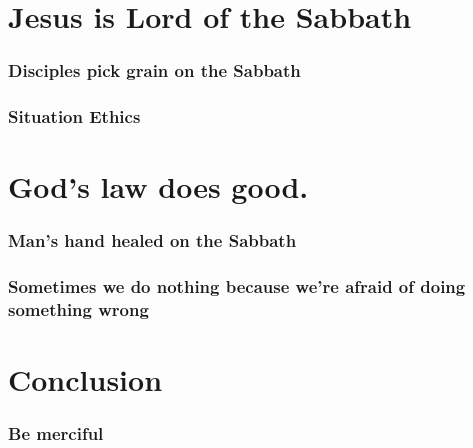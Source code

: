 \documentclass{beamer}
\begin{document}
\section{Jesus is Lord of the Sabbath}

\begin{frame}
\frametitle{Disciples pick grain on the Sabbath}
\end{frame}

\begin{frame}
\frametitle{Situation Ethics}
\end{frame}

\section{God's law does good.}

\begin{frame}
\frametitle{Man's hand healed on the Sabbath}
\end{frame}

\begin{frame}
\frametitle{Sometimes we do nothing because we're afraid of doing something wrong}
\end{frame}

\section*{Conclusion}
\begin{frame}
\frametitle{Be merciful}
\end{frame}
\end{document}
